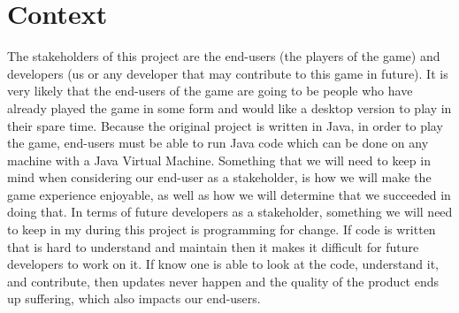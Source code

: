 \documentclass{article}
\begin{document}
\section{Context}
    The stakeholders of this project are the end-users (the players of the game) and developers (us or any developer that may contribute to this game in future). It is very likely that the end-users of the game are going to be people who have already played the game in some form and would like a desktop version to play in their spare time. Because the original project is written in Java, in order to play the game, end-users must be able to run Java code which can be done on any machine with a Java Virtual Machine. {\color{red} Something that we will need to keep in mind when considering our end-user as a stakeholder, is how we will make the game experience enjoyable, as well as how we will determine that we succeeded in doing that. In terms of future developers as a stakeholder, something we will need to keep in my during this project is programming for change. If code is written that is hard to understand and maintain then it makes it difficult for future developers to work on it. If know one is able to look at the code, understand it, and contribute, then updates never happen and the quality of the product ends up suffering, which also impacts our end-users.}
    
\end{document}
